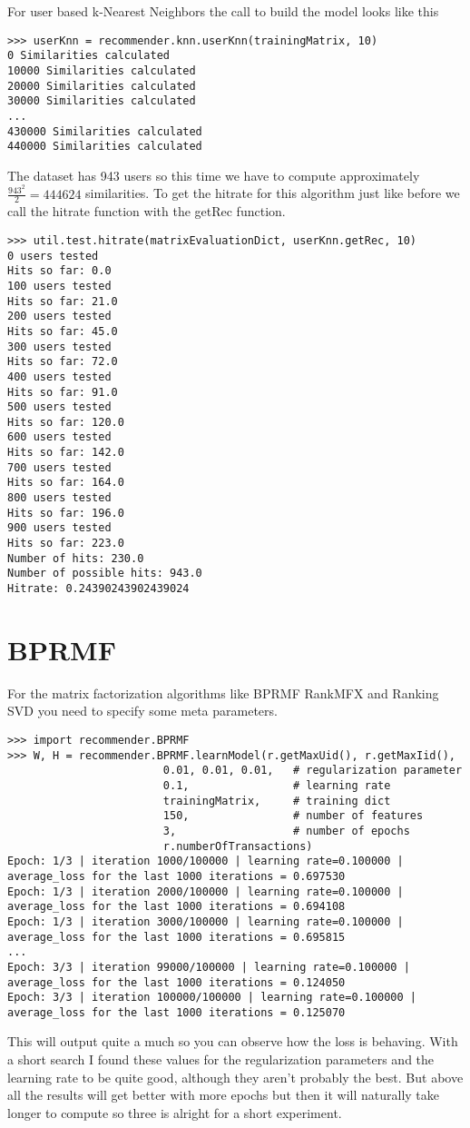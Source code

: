 For user based k-Nearest Neighbors the call to build the model looks like this
\begin{lstlisting}
>>> userKnn = recommender.knn.userKnn(trainingMatrix, 10)
0 Similarities calculated
10000 Similarities calculated
20000 Similarities calculated
30000 Similarities calculated
...
430000 Similarities calculated
440000 Similarities calculated
\end{lstlisting}
The dataset has 943 users so this time we have to compute approximately
\begin{math} \frac{943^2}{2} = 444624 \end{math} similarities.
To get the hitrate for this algorithm just like before we call the hitrate
function with the getRec function.
\begin{lstlisting}
>>> util.test.hitrate(matrixEvaluationDict, userKnn.getRec, 10)
0 users tested
Hits so far: 0.0
100 users tested
Hits so far: 21.0
200 users tested
Hits so far: 45.0
300 users tested
Hits so far: 72.0
400 users tested
Hits so far: 91.0
500 users tested
Hits so far: 120.0
600 users tested
Hits so far: 142.0
700 users tested
Hits so far: 164.0
800 users tested
Hits so far: 196.0
900 users tested
Hits so far: 223.0
Number of hits: 230.0
Number of possible hits: 943.0
Hitrate: 0.24390243902439024
\end{lstlisting}

\section{BPRMF}
For the matrix factorization algorithms like BPRMF RankMFX
and Ranking SVD you need to specify some meta parameters.
\begin{lstlisting}
>>> import recommender.BPRMF
>>> W, H = recommender.BPRMF.learnModel(r.getMaxUid(), r.getMaxIid(),
                        0.01, 0.01, 0.01,   # regularization parameter
                        0.1,                # learning rate
                        trainingMatrix,     # training dict
                        150,                # number of features
                        3,                  # number of epochs
                        r.numberOfTransactions)
Epoch: 1/3 | iteration 1000/100000 | learning rate=0.100000 | average_loss for the last 1000 iterations = 0.697530
Epoch: 1/3 | iteration 2000/100000 | learning rate=0.100000 | average_loss for the last 1000 iterations = 0.694108
Epoch: 1/3 | iteration 3000/100000 | learning rate=0.100000 | average_loss for the last 1000 iterations = 0.695815
...
Epoch: 3/3 | iteration 99000/100000 | learning rate=0.100000 | average_loss for the last 1000 iterations = 0.124050
Epoch: 3/3 | iteration 100000/100000 | learning rate=0.100000 | average_loss for the last 1000 iterations = 0.125070
\end{lstlisting}
This will output quite a much so you can observe how the loss is behaving.
With a short search I found these values for the regularization parameters
and the learning rate to be quite good, although they aren't probably the
best. But above all the results will get better with more epochs but then
it will naturally take longer to compute so three is alright for a short
experiment.

